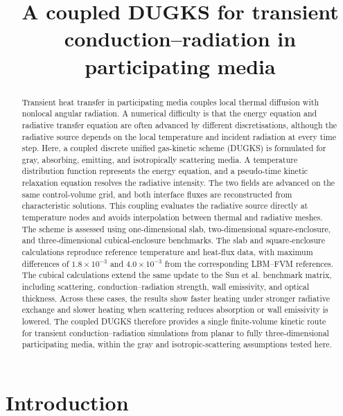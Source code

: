 \documentclass[a4paper,12pt]{ctexart}
\numberwithin{equation}{section}
\begin{document}
\title{A coupled DUGKS for transient conduction–radiation in participating media}

\begin{abstract}
Transient heat transfer in participating media couples local thermal diffusion with nonlocal angular radiation. A numerical difficulty is that the energy equation and radiative transfer equation are often advanced by different discretisations, although the radiative source depends on the local temperature and incident radiation at every time step. Here, a coupled discrete unified gas-kinetic scheme (DUGKS) is formulated for gray, absorbing, emitting, and isotropically scattering media. A temperature distribution function represents the energy equation, and a pseudo-time kinetic relaxation equation resolves the radiative intensity. The two fields are advanced on the same control-volume grid, and both interface fluxes are reconstructed from characteristic solutions. This coupling evaluates the radiative source directly at temperature nodes and avoids interpolation between thermal and radiative meshes. The scheme is assessed using one-dimensional slab, two-dimensional square-enclosure, and three-dimensional cubical-enclosure benchmarks. The slab and square-enclosure calculations reproduce reference temperature and heat-flux data, with maximum differences of $1.8\times10^{-3}$ and $4.0\times10^{-3}$ from the corresponding LBM--FVM references. The cubical calculations extend the same update to the Sun et al. benchmark matrix, including scattering, conduction--radiation strength, wall emissivity, and optical thickness. Across these cases, the results show faster heating under stronger radiative exchange and slower heating when scattering reduces absorption or wall emissivity is lowered. The coupled DUGKS therefore provides a single finite-volume kinetic route for transient conduction--radiation simulations from planar to fully three-dimensional participating media, within the gray and isotropic-scattering assumptions tested here.
\end{abstract}

\section{Introduction}
\label{sec:introduction}
\end{document}
